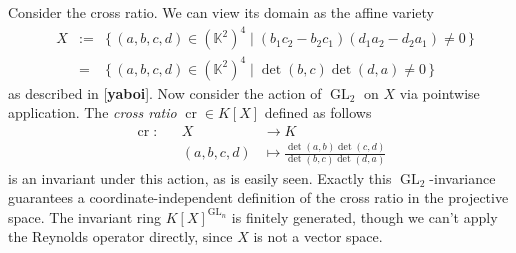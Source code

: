 \begin{example}
  Consider the cross ratio.
  We can view its domain as the affine variety
  \begin{equation}
    \begin{aligned}
      &X&:=&\{\, (a,b,c,d) \in (\mathbb{K}^2)^4 \mid (b_1c_2 - b_2c_1)(d_1a_2 - d_2a_1) \neq 0 \,\}\\
      &&=& \{\, (a,b,c,d) \in (\mathbb{K}^2)^4 \mid \operatorname{det}(b,c)\operatorname{det}(d,a) \neq 0 \,\}
    \end{aligned}
  \end{equation}
  as described in [\textbf{yaboi}].
  Now consider the action of $\operatorname{GL}_2$ on $X$ via pointwise application.
  The \textit{cross ratio} $\operatorname{cr} \in K[X]$ defined as follows
  \begin{equation}
    \begin{aligned}
      \operatorname{cr} \colon&&X&\longrightarrow K \\
      &&(a,b,c,d) &\longmapsto \frac{\operatorname{det}(a,b)\operatorname{det}(c,d)}{\operatorname{det}(b,c)\operatorname{det}(d,a)}
    \end{aligned}
  \end{equation}
  is an invariant under this action, as is easily seen.
  Exactly this $\operatorname{GL}_2$-invariance guarantees a coordinate-independent definition of the cross ratio in the projective space.
  The invariant ring $K[X]^{\operatorname{GL}_n}$ is finitely generated, though we can't apply the Reynolds operator directly, since $X$ is not a vector space.
\end{example}

